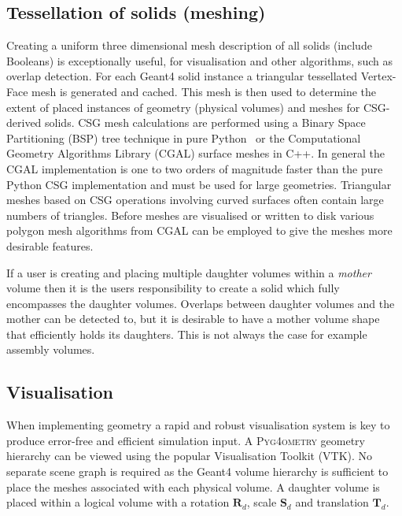 \documentclass[final,5p,times,twocolumn]{elsarticle}
\newcommand{\PYGEOMETRY}{\textsc{Pyg4ometry}}
\begin{document}
\subsection{Tessellation of solids (meshing)}
Creating a uniform three dimensional mesh description of all solids (include Booleans) is exceptionally useful, for visualisation and other algorithms, such as overlap 
detection. For each Geant4 solid instance a triangular tessellated Vertex-Face mesh is generated and cached. This mesh is then used to determine the extent 
of placed instances of geometry (physical volumes) and meshes for CSG-derived solids. CSG mesh calculations are performed using a Binary Space Partitioning 
(BSP) tree technique in pure Python~\cite{pycsg} or the Computational Geometry Algorithms Library (CGAL) surface meshes \cite{cgal:bsmf-sm-20b} in C++. In 
general the CGAL implementation is one to two orders of magnitude faster than the pure Python CSG implementation and must be used for large geometries. 
Triangular meshes based on CSG operations involving curved surfaces often contain large numbers of triangles. Before meshes are visualised or written to disk 
various polygon mesh algorithms  from CGAL \cite{cgal:lty-pmp-20b} can be employed to give the meshes more desirable features. 

If a user is creating and placing multiple daughter volumes within a {\em mother} volume then it is the users responsibility to create a solid which fully 
encompasses the daughter volumes. Overlaps between daughter volumes and the mother can be detected to, but it is desirable 
to have a mother volume shape that efficiently holds its daughters. This is not always the case for example assembly volumes. 
 
\subsection{Visualisation} \label{sec:visualisation}
When implementing geometry a rapid and robust visualisation system is key to produce error-free and efficient simulation input.
A  \PYGEOMETRY{} geometry hierarchy can be viewed using the popular Visualisation Toolkit (VTK). No separate scene graph is required as the Geant4 
volume hierarchy is sufficient to place the meshes associated with each physical volume. A daughter volume is placed within a logical volume with a rotation 
$\mathbf{R}_d$, scale $\mathbf{S}_d$ and translation $\mathbf{T}_d$.
\end{document}
